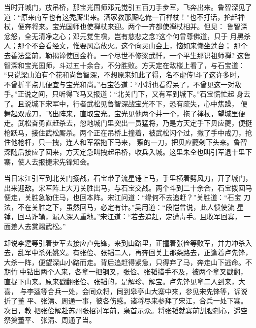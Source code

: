 当时开城门，放吊桥，那宝光国师邓元觉引五百刀手步军，飞奔出来。鲁智深见了
道：“原来南军也有这秃厮出来。洒家教那厮吃俺一百禅杖！”也不打话，抡起禅
杖，便奔将来。宝光国师也使禅杖来迎。两个一齐都使禅杖相并。但见：
鲁智深忿怒，全无清净之心；邓元觉生嗔，岂有慈悲之念?这个何曾尊佛道，只于
月黑杀人；那个不会看经文，惟要风高放火。这个向灵山会上，恼如来懒坐莲台；
那个去善法堂前，勒揭谛使回金杵。一个尽世不修梁武忏，一个平生那识祖师禅?
这鲁智深和宝光国师，斗过五十余合，不分胜败。方天定在敌楼上看了，与石宝道：
“只说梁山泊有个花和尚鲁智深，不想原来如此了得，名不虚传!斗了这许多时，
不曾折半点儿便宜与宝光和尚。”石宝答道：“小将也看得呆了，不曾见这一对敌
手。”正说之间，只听得飞马又报道：“北关门下，又有军到城下。”石宝慌忙起
身去了。且说城下宋军中，行者武松见鲁智深战宝光不下，恐有疏失，心中焦躁，
便舞起双戒刀，飞出阵来，直取宝光。宝光见他两个并一个，拖了禅杖，望城里便
走。武松奋勇直赶杀去，忽地城门里突出一员猛将，乃是方天定手下贝应夔，便挺
枪跃马，接住武松厮杀。两个正在吊桥上撞着，被武松闪个过，撇了手中戒刀，抢
住他枪杆，只一拽，连人和军器拖下马来，察的一刀，把贝应夔剁下头来。鲁智
深随后接应了回来，方天定急叫拽起吊桥，收兵入城。这里朱仝也叫引军退十里下
寨，使人去报捷宋先锋知会。

当日宋江引军到北关门搦战，石宝带了流星锤上马，手里横着劈风刀，开了城门，
出来迎敌。宋军阵上大刀关胜出马，与石宝交战。两个斗到二十余合，石宝拨回马
便走，关胜急勒住马，也回本阵。宋江问道：“缘何不去追赶？”关胜道：“石宝
刀法，不在关胜之下，虽然回马，必定有计。”吴用道：“段恺曾说，此人惯使流
星锤，回马诈输，漏人深入重地。”宋江道：“若去追赶，定遭毒手。且收军回寨，
一面差人去赏赐武松。”

却说李逵等引着步军去接应卢先锋，来到山路里，正撞着张俭等败军，并力冲杀入
去，乱军中杀死姚义。有张俭、张韬二人，再奔回关上那条路去，正逢着卢先锋，
大杀一阵，便望深山小路而走。背后追赶得紧急，只得弃了马，奔走山下逃命。不
期竹中钻出两个人来，各拿一把钢叉，张俭、张韬措手不及，被两个拿叉戳翻，
直捉下山来。原来戳翻张俭、张韬的，是解珍、解宝。卢先锋见拿二人到来，大喜，
与李逵等合兵一处，会同众将，同到皋亭山大寨中来，参见宋先锋等，诉说折了董
平、张清、周通一事，彼各伤感。诸将尽来参拜了宋江，合兵一处下寨。次日，教
把张俭解赴苏州张招讨军前，枭首示众。将张韬就寨前割腹剜心，遥空祭奠董平、
张清、周通了当。

